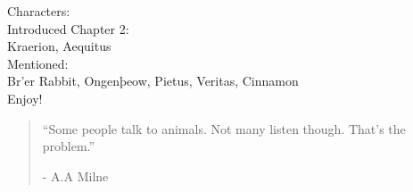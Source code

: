 \documentclass[smalldemyvopaper,11pt,twoside,onecolumn,openright,extrafontsizes]{memoir}
\begin{document}
Characters:\\[1cm]
Introduced Chapter 2:\\[0.1cm]
Kraerion,
Aequitus\\[0.1cm]
Mentioned:\\[0.1cm]
Br'er Rabbit,
Ongenþeow,
Pietus,
Veritas,
Cinnamon\\[1cm]


Enjoy!



\clearpage
\tableofcontents*

\clearpage


	

\clearpage

\vspace*{4.3cm}
\begin{localsize}{10}
  \begin{quote}
    “Some people talk to animals. Not many listen though. That's the problem.”
    \begin{flushright}- A.A Milne \end{flushright}
  \end{quote} 
\end{localsize}
\vspace{1cm}



\end{document}
